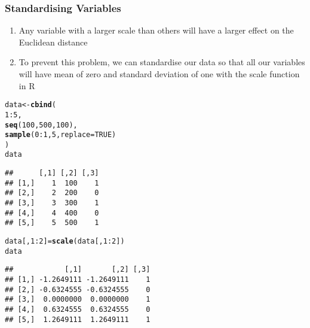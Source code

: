 \documentclass[../../dsa1101_notes.Rtex]{subfiles}\usepackage[]{graphicx}\usepackage[]{color}
\makeatletter
\newcommand{\hlnum}[1]{\textcolor[rgb]{0.686,0.059,0.569}{#1}}%
\newcommand{\hlopt}[1]{\textcolor[rgb]{0,0,0}{#1}}%
\newcommand{\hlstd}[1]{\textcolor[rgb]{0.345,0.345,0.345}{#1}}%
\newcommand{\hlkwb}[1]{\textcolor[rgb]{0.69,0.353,0.396}{#1}}%
\newcommand{\hlkwc}[1]{\textcolor[rgb]{0.333,0.667,0.333}{#1}}%
\newcommand{\hlkwd}[1]{\textcolor[rgb]{0.737,0.353,0.396}{\textbf{#1}}}%
\newenvironment{kframe}{%
 \def\at@end@of@kframe{}%
 \ifinner\ifhmode%
  \def\at@end@of@kframe{\end{minipage}}%
  \begin{minipage}{\columnwidth}%
 \fi\fi%
 \def\FrameCommand##1{\hskip\@totalleftmargin \hskip-\fboxsep
 \colorbox{shadecolor}{##1}\hskip-\fboxsep
     \hskip-\linewidth \hskip-\@totalleftmargin \hskip\columnwidth}%
 \MakeFramed {\advance\hsize-\width
   \@totalleftmargin\z@ \linewidth\hsize
   \@setminipage}}%
 {\par\unskip\endMakeFramed%
 \at@end@of@kframe}
\newenvironment{knitrout}{}{} %
\makeatother
\begin{document}
\subsubsection{Standardising Variables}
\begin{enumerate}
    \item Any variable with a larger scale than others will have a larger effect on the Euclidean distance
    \item To prevent this problem, we can standardise our data so that all our variables will have mean of zero and standard deviation of one with the scale function in R
\end{enumerate}
\begin{knitrout}
\color{fgcolor}\begin{kframe}
\begin{alltt}
\hlstd{data} \hlkwb{<-} \hlkwd{cbind}\hlstd{(}
    \hlnum{1}\hlopt{:}\hlnum{5}\hlstd{,}
    \hlkwd{seq}\hlstd{(}\hlnum{100}\hlstd{,} \hlnum{500}\hlstd{,} \hlnum{100}\hlstd{),}
    \hlkwd{sample}\hlstd{(}\hlnum{0}\hlopt{:}\hlnum{1}\hlstd{,} \hlnum{5}\hlstd{,} \hlkwc{replace} \hlstd{=} \hlnum{TRUE}\hlstd{)}
\hlstd{)}
\hlstd{data}
\end{alltt}
\begin{verbatim}
##      [,1] [,2] [,3]
## [1,]    1  100    1
## [2,]    2  200    0
## [3,]    3  300    1
## [4,]    4  400    0
## [5,]    5  500    1
\end{verbatim}
\begin{alltt}
\hlstd{data[,} \hlnum{1}\hlopt{:}\hlnum{2}\hlstd{]} \hlkwb{=} \hlkwd{scale}\hlstd{(data[,} \hlnum{1}\hlopt{:}\hlnum{2}\hlstd{])}
\hlstd{data}
\end{alltt}
\begin{verbatim}
##            [,1]       [,2] [,3]
## [1,] -1.2649111 -1.2649111    1
## [2,] -0.6324555 -0.6324555    0
## [3,]  0.0000000  0.0000000    1
## [4,]  0.6324555  0.6324555    0
## [5,]  1.2649111  1.2649111    1
\end{verbatim}
\end{kframe}
\end{knitrout}
\end{document}
